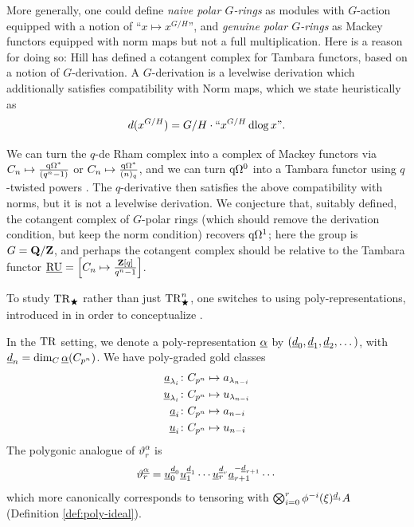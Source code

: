 \begin{conjecture}
  More generally, one could define \emph{naive polar $G$-rings} as modules with $G$-action equipped with a notion of ``$x \mapsto x^{G/H}$'', and \emph{genuine polar $G$-rings} as Mackey functors equipped with norm maps but not a full multiplication. Here is a reason for doing so: Hill \cite{HillTambaraAQ} has defined a cotangent complex for Tambara functors, based on a notion of $G$-derivation. A $G$-derivation is a levelwise derivation which additionally satisfies compatibility with Norm maps, which we state heuristically as
  \[ d(x^{G/H}) = G/H \cdot \text{``$x^{G/H} \operatorname{dlog} x$''}. \]

  We can turn the $q$-de Rham complex into a complex of Mackey functors via $C_n \mapsto \frac{\mathrm{q}\Omega^*}{(q^n-1)}$ or $C_n \mapsto \frac{\mathrm{q}\Omega^*}{(n)_q}$, and we can turn $\mathrm{q}\Omega^0$ into a Tambara functor using $q$-twisted powers \cite[]{PrismsTambara1}. The $q$-derivative then satisfies the above compatibility with norms, but it is not a levelwise derivation. We conjecture that, suitably defined, the cotangent complex of $G$-polar rings (which should remove the derivation condition, but keep the norm condition) recovers $\mathrm{q}\Omega^1$; here the group is $G=\mathbf Q/\mathbf Z$, and perhaps the cotangent complex should be relative to the Tambara functor $\underline{\operatorname{RU}} = \left[C_n \mapsto \frac{\mathbf Z[q]}{q^n-1}\right]$.
\end{conjecture}

\begin{notation}
  To study $\mathrm{TR}_\bigstar$ rather than just $\mathrm{TR}^n_\bigstar$, one switches to using poly-representations, introduced in \cite[]{SulSlopes} in order to conceptualize \cite[Proposition 4.2.3]{HMCyclicPolytopes}.

  In the $\mathrm{TR}$ setting, we denote a poly-representation $\underline\alpha$ by $(\underline d_0, \underline d_1, \underline d_2,\dotsc)$, with $\underline d_n = \dim_C \underline\alpha(C_{p^n})$. We have poly-graded gold classes
  \begin{align*}
    \underline a_{\lambda_i} \colon C_{p^n} &\mapsto a_{\lambda_{n-i}}\\
    \underline u_{\lambda_i} \colon C_{p^n} &\mapsto u_{\lambda_{n-i}}\\
    \underline a_i \colon C_{p^n} &\mapsto a_{n-i}\\
    \underline u_i \colon C_{p^n} &\mapsto u_{n-i}
  \end{align*}
  The polygonic analogue of $\vartheta^\alpha_r$ is
  \[ \vartheta^{\underline\alpha}_r = \underline u_0^{\underline d_0}\underline u_1^{\underline d_1}\dotsm\underline u_r^{\underline d_r} \underline a_{r+1}^{-\underline d_{r+1}}\dotsm \]
  which more canonically corresponds to tensoring with $\bigotimes_{i=0}^r \phi^{-i}(\xi)^{\underline d_i}A$ (Definition \ref{def:poly-ideal}).
\end{notation}

